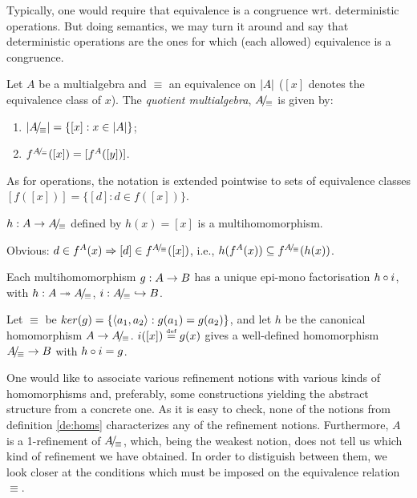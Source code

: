 Typically, one would require that equivalence is a congruence
wrt. deterministic operations. But doing semantics, we may turn it around and
say that deterministic operations are the ones for which (each allowed) equivalence is a congruence.
\begin{DEFINITION}{}\label{de:quot}
Let $A$ be a multialgebra and $\equiv$ an equivalence on $|A|$ ($[x]$ denotes
the equivalence class of $x$). The {\em quotient multialgebra}, $A\!/\!_\equiv$ is given by:
\begin{enumerate}\MyLPar
\item $|A\!/\!_\equiv| = \{[x]:x\in |A|\}$;
\item $f^{A\!/\!_\equiv}([x]) = [f^A([y])]$.
\end{enumerate}
\end{DEFINITION}
\noindent
As for operations, the notation is extended pointwise to sets of equivalence 
classes $[f([x])] = \{[d]:d\in f([x])\}$.
%
\begin{LEMMA}\label{le:qoutHomo}
 $h:A\rightarrow A\!/\!_\equiv$ defined by $h(x)=[x]$ is a multihomomorphism.
\end{LEMMA}
\begin{PROOF}
Obvious: $d\in f^A(x) \mathrel\Rightarrow [d]\in f^{A\!/\!_\equiv}([x])$, i.e.,
 $h(f^A(x))\subseteq f^{A\!/\!_\equiv}(h(x))$.
\end{PROOF}
%
\begin{LEMMA}\label{le:epi-mono}
Each multihomomorphism $g:A\rightarrow B$ has a unique epi-mono factorisation
 $h\circ i$, with $h:A\twoheadrightarrow A\!/\!_\equiv$, $i:A\!/\!_\equiv \mathrel{\hookrightarrow} B$.
\end{LEMMA}
\begin{PROOF}
Let $\equiv$ be $ker(g) = \{\langle a_1,a_2\rangle: g(a_1)=g(a_2)\}$, and let $h$ be the
canonical homomorphism $A\rightarrow A\!/\!_\equiv$.  $i([x])\mathrel{\stackrel{\mbox{\tiny def}}{=}} g(x)$ gives a
well-defined homomorphism $A\!/\!_\equiv \rightarrow B$ with $h\circ i=g$.
\end{PROOF}
\noindent
One would like to associate various refinement notions with various kinds of
homomorphisms and, preferably, some constructions yielding the abstract
structure from a concrete one. As it is easy to check, none of the notions
from definition \ref{de:homs} characterizes any of the refinement
notions. Furthermore, $A$ is a 1-refinement of $A\!/\!_\equiv$,
 which, being the weakest notion, does not tell us which
kind of refinement we have obtained. In order to distiguish between them, we
look closer at the conditions which must be imposed on the equivalence
relation $\equiv$.

